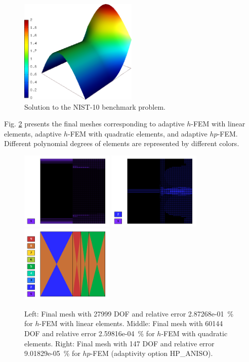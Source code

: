 \documentclass[12pt]{elsarticle}
\begin{document}
\begin{figure}[H]
\centering
\vspace{-6mm}
\includegraphics[height=5cm]{nist/nist-10/solution.png}
\vspace{-3mm}
\caption{Solution to the NIST-10 benchmark problem.}
\vspace{-3mm}
\label{fig:sln-nist10}
\end{figure}

Fig. \ref{fig:nist-10-hp-aniso} presents the final meshes corresponding to adaptive $h$-FEM with
linear elements, adaptive $h$-FEM with quadratic elements, and adaptive $hp$-FEM. Different
polynomial degrees of elements are represented by different colors.

\begin{figure}[H]
\centering
\vspace{-3mm}
\includegraphics[height=3.7cm]{nist/nist-10/mesh_h1_aniso.png}
\includegraphics[height=3.7cm]{nist/nist-10/mesh_h2_aniso.png}
\includegraphics[height=3.7cm]{nist/nist-10/mesh_hp_aniso.png}
\vspace{-3mm}
\caption{
Left: Final mesh with 27999 DOF and relative error 2.87268e-01~\% for $h$-FEM with linear elements.
Middle: Final mesh with 60144 DOF and relative error 2.59816e-04~\% for $h$-FEM with quadratic elements.
Right: Final mesh with 147 DOF and relative error 9.01829e-05~\% for $hp$-FEM (adaptivity option HP\_ANISO).}
\vspace{-3mm}
\label{fig:nist-10-hp-aniso}
\end{figure}
\end{document}
